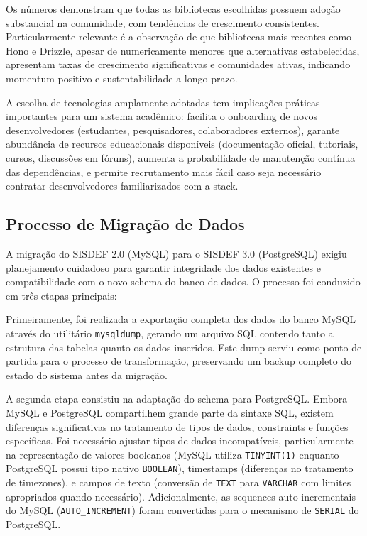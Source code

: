 \documentclass[nonacm, sigconf]{acmart}
\begin{document}
Os números demonstram que todas as bibliotecas escolhidas possuem adoção substancial na comunidade, com tendências de crescimento consistentes. Particularmente relevante é a observação de que bibliotecas mais recentes como Hono e Drizzle, apesar de numericamente menores que alternativas estabelecidas, apresentam taxas de crescimento significativas e comunidades ativas, indicando momentum positivo e sustentabilidade a longo prazo.

A escolha de tecnologias amplamente adotadas tem implicações práticas importantes para um sistema acadêmico: facilita o onboarding de novos desenvolvedores (estudantes, pesquisadores, colaboradores externos), garante abundância de recursos educacionais disponíveis (documentação oficial, tutoriais, cursos, discussões em fóruns), aumenta a probabilidade de manutenção contínua das dependências, e permite recrutamento mais fácil caso seja necessário contratar desenvolvedores familiarizados com a stack.

\subsection{Processo de Migração de Dados}

A migração do SISDEF 2.0 (MySQL) para o SISDEF 3.0 (PostgreSQL) exigiu planejamento cuidadoso para garantir integridade dos dados existentes e compatibilidade com o novo schema do banco de dados. O processo foi conduzido em três etapas principais:

Primeiramente, foi realizada a exportação completa dos dados do banco MySQL através do utilitário \texttt{mysqldump}, gerando um arquivo SQL contendo tanto a estrutura das tabelas quanto os dados inseridos. Este dump serviu como ponto de partida para o processo de transformação, preservando um backup completo do estado do sistema antes da migração.

A segunda etapa consistiu na adaptação do schema para PostgreSQL. Embora MySQL e PostgreSQL compartilhem grande parte da sintaxe SQL, existem diferenças significativas no tratamento de tipos de dados, constraints e funções específicas. Foi necessário ajustar tipos de dados incompatíveis, particularmente na representação de valores booleanos (MySQL utiliza \texttt{TINYINT(1)} enquanto PostgreSQL possui tipo nativo \texttt{BOOLEAN}), timestamps (diferenças no tratamento de timezones), e campos de texto (conversão de \texttt{TEXT} para \texttt{VARCHAR} com limites apropriados quando necessário). Adicionalmente, as sequences auto-incrementais do MySQL (\texttt{AUTO\_INCREMENT}) foram convertidas para o mecanismo de \texttt{SERIAL} do PostgreSQL.
\end{document}
